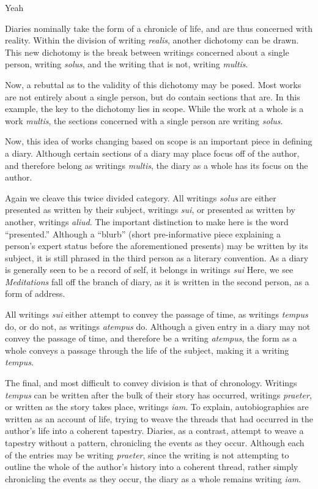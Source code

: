 Yeah \documentclass[12pt]{article}[titlepage]
\newcommand{\say}[1]{``#1''}
\newcommand{\1}{\={a}}
\newcommand{\2}{\={e}}
\newcommand{\3}{\={\i}}
\newcommand{\4}{\=o}
\newcommand{\5}{\=u}
\newcommand{\6}{\={A}}
\renewcommand{\,}{\textsuperscript{,}}
\begin{document}
Diaries nominally take the form of a chronicle of life, and are thus concerned with reality.
Within the division of writing \textit{realis}, another dichotomy can be drawn.
This new dichotomy is the break between writings concerned about a single person, writing \textit{solus}, and the writing that is not, writing \textit{multis}.

Now, a rebuttal as to the validity of this dichotomy may be posed.
Most works are not entirely about a single person, but do contain sections that are.
In this example, the key to the dichotomy lies in scope.
While the work at a whole is a work \textit{multis}, the sections concerned with a single person are writing \textit{solus}.

Now, this idea of works changing based on scope is an important piece in defining a diary.
Although certain sections of a diary may place focus off of the author, and therefore belong as writings \textit{multis}, the diary as a whole has its focus on the author.

Again we cleave this twice divided category.
All writings \textit{solus} are either presented as written by their subject, writings \textit{sui}, or presented as written by another, writings \textit{aliud}.
The important distinction to make here is the word \say{presented.}
Although a \say{blurb} (short pre-informative piece explaining a person's expert status before the aforementioned presents) may be written by its subject, it is still phrased in the third person as a literary convention.
As a diary is generally seen to be a record of self, it belongs in writings \textit{sui}
Here, we see \textit{Meditations} fall off the branch of diary, as it is written in the second person, as a form of address. 

All writings \textit{sui} either attempt to convey the passage of time, as writings \textit{tempus} do, or do not, as writings \textit{atempus} do.
Although a given entry in a diary may not convey the passage of time, and therefore be a writing \textit{atempus}, the form as a whole conveys a passage through the life of the subject, making it a writing \textit{tempus}.

The final, and most difficult to convey division is that of chronology.
Writings \textit{tempus} can be written after the bulk of their story has occurred, writings \textit{praeter}, or written as the story takes place, writings \textit{iam}.
To explain, autobiographies are written as an account of life, trying to weave the threads that had occurred in the author's life into a coherent tapestry.
Diaries, as a contrast, attempt to weave a tapestry without a pattern, chronicling the events as they occur.
Although each of the entries may be writing \textit{praeter}, since the writing is not attempting to outline the whole of the author's history into a coherent thread, rather simply chronicling the events as they occur, the diary as a whole remains writing \textit{iam}.
\end{document}
